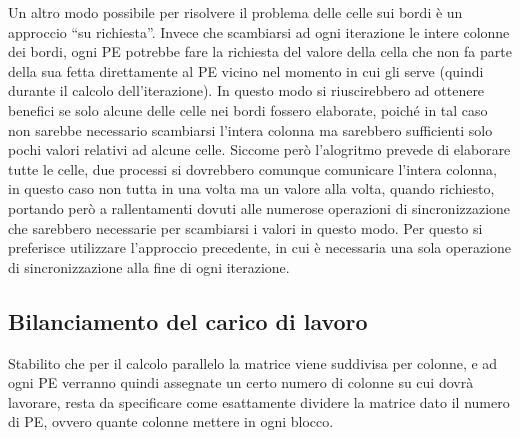 Un altro modo possibile per risolvere il problema delle celle sui bordi \`e un approccio ``su richiesta''. Invece che scambiarsi ad ogni iterazione le intere colonne dei bordi, ogni PE potrebbe fare la richiesta del valore della cella che non fa parte della sua fetta direttamente al PE vicino nel momento in cui gli serve (quindi durante il calcolo dell'iterazione). In questo modo si riuscirebbero ad ottenere benefici se solo alcune delle celle nei bordi fossero elaborate, poich\'e in tal caso non sarebbe necessario scambiarsi l'intera colonna ma sarebbero sufficienti solo pochi valori relativi ad alcune celle. Siccome per\`o l'alogritmo prevede di elaborare tutte le celle, due processi si dovrebbero comunque comunicare l'intera colonna, in questo caso non tutta in una volta ma un valore alla volta, quando richiesto, portando per\`o a rallentamenti dovuti alle numerose operazioni di sincronizzazione che sarebbero necessarie per scambiarsi i valori in questo modo. Per questo si preferisce utilizzare l'approccio precedente, in cui \`e necessaria una sola operazione di sincronizzazione alla fine di ogni iterazione.

\subsection{Bilanciamento del carico di lavoro}
Stabilito che per il calcolo parallelo la matrice viene suddivisa per colonne, e ad ogni PE verranno quindi assegnate un certo numero di colonne su cui dovr\`a lavorare, resta da specificare come esattamente dividere la matrice dato il numero di PE, ovvero quante colonne mettere in ogni blocco.


